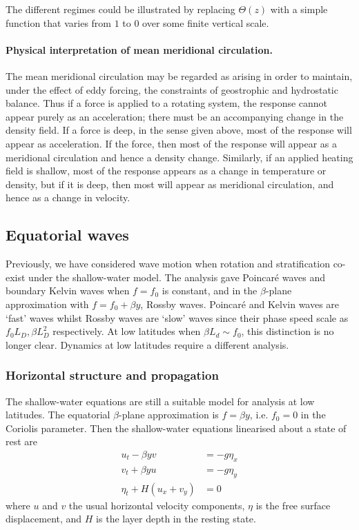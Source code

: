 \documentclass{jknotes}
\begin{document}
The different regimes could be illustrated by replacing $\Theta(z)$ with a
simple function that varies from $1$ to $0$ over some finite vertical scale. 

\paragraph{Physical interpretation of mean meridional circulation.} The mean
meridional circulation may be regarded as arising in order to maintain, under
the effect of eddy forcing, the constraints of geostrophic and hydrostatic
balance. Thus if a force is applied to a rotating system, the response cannot
appear purely as an acceleration; there must be an accompanying change in the
density field. If a force is deep, in the sense given above, most of the
response will appear as acceleration. If the force, then most of the response
will appear as a meridional circulation and hence a density change. Similarly,
if an applied heating field is shallow, most of the response appears as a
change in temperature or density, but if it is deep, then most will appear as
meridional circulation, and hence as a change in velocity. 

\subsection{Equatorial waves}
Previously, we have considered wave motion when rotation and stratification
co-exist under the shallow-water model. The analysis gave Poincar\'{e} waves
and boundary Kelvin waves when $f = f_0$ is constant, and in the $\beta$-plane
approximation with $f = f_0 + \beta y$, Rossby waves. Poincar\'{e} and Kelvin
waves are `fast' waves whilst Rossby waves are `slow' waves since their
phase speed scale as $f_0 L_D, \beta L_D^2$ respectively. At low latitudes
when $\beta L_d \sim f_0$, this distinction is no longer clear. Dynamics at
low latitudes require a different analysis.

\subsubsection{Horizontal structure and propagation}
\label{ss:lategnfunc}
The shallow-water equations are still a suitable model for analysis at low
latitudes. The equatorial $\beta$-plane approximation is $f = \beta y$, i.e.
$f_0 = 0$ in the Coriolis parameter. Then the shallow-water equations
linearised about a state of rest are
\begin{align}
	u_t - \beta y v &= - g \eta_x \label{eq:sweq1} \\
	v_t + \beta y u &= - g \eta_y \label{eq:sweq2} \\
	\eta_t + H(u_x + v_y) &= 0\label{eq:sweq3}
\end{align}
where $u$ and $v$ the usual horizontal velocity components, $\eta$ is the free
surface displacement, and $H$ is the layer depth in the resting state.
\end{document}

